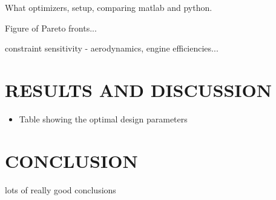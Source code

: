 \documentclass[letterpaper, 10 pt, conference]{ieeeconf}  %
\begin{document}
What optimizers, setup, comparing matlab and python. 

Figure of Pareto fronts...

constraint sensitivity - aerodynamics, engine efficiencies...

\section{RESULTS AND DISCUSSION}

\begin{itemize}
	\item{Table showing the optimal design parameters}
\end{itemize}



\section{CONCLUSION}

lots of really good conclusions









\end{document}
